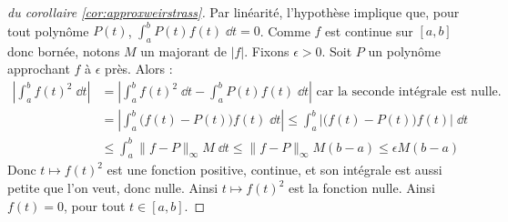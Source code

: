 \documentclass[class=report,crop=false]{standalone}
\begin{document}
\begin{proof}[du corollaire \ref{cor:approxweirstrass}]
Par linéarité, l'hypothèse implique que, pour tout polynôme $P(t)$,
$\int_a^b P(t) f(t) \;\dd t = 0$.
Comme $f$ est continue sur $[a,b]$ donc bornée, notons $M$ un majorant de $|f|$.
Fixons $\epsilon>0$. Soit $P$ un polynôme approchant $f$ à $\epsilon$ près. Alors :
\begin{align*}
\left|\int_a^b f(t)^2 \;\dd t \right|
& = \left|\int_a^b f(t)^2 \;\dd t - \int_a^b P(t)f(t) \;\dd t \right|  \text{ car la seconde intégrale est nulle.} \\
& = \left|\int_a^b \big(f(t) - P(t)\big) f(t) \;\dd t \right|
 \le \int_a^b \left|\big(f(t) - P(t)\big) f(t)\right| \;\dd t \\
 & \le \int_a^b\| f - P \|_{\infty} M \;\dd t 
 \le \| f - P \|_{\infty} M (b-a) 
 \le \epsilon M(b-a)
\end{align*}
Donc $t \mapsto f(t)^2$ est une fonction positive, continue, et son intégrale est aussi petite que l'on veut, donc nulle.
Ainsi $t \mapsto f(t)^2$ est la fonction nulle. Ainsi $f(t)=0$, pour tout $t\in [a,b]$.
\end{proof}
\end{document}

